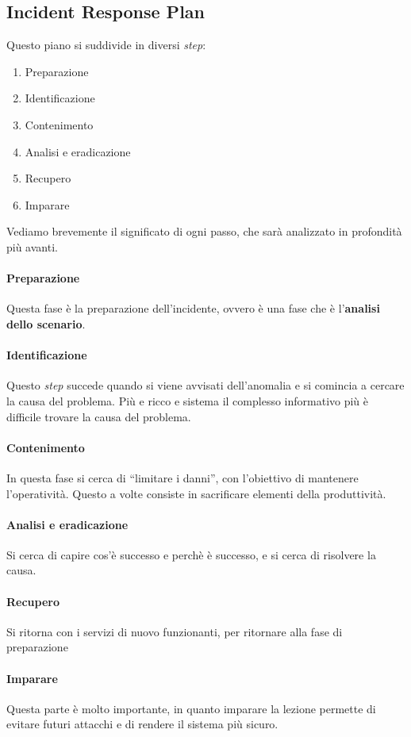 \subsection{Incident Response Plan}

Questo piano si suddivide in diversi \textit{step}:
\begin{enumerate}
\item Preparazione
\item Identificazione
\item Contenimento
\item Analisi e eradicazione
\item Recupero
\item Imparare
\end{enumerate} 

Vediamo brevemente il significato di ogni passo, che sarà analizzato in 
profondità più avanti.

\paragraph*{Preparazione} Questa fase è la preparazione dell'incidente, ovvero è 
una fase che è l'\textbf{analisi dello scenario}.

\paragraph*{Identificazione} Questo \textit{step} succede quando si viene 
avvisati dell'anomalia e si comincia a cercare la causa del problema. Più e 
ricco e sistema il complesso informativo più è difficile trovare la causa del 
problema.

\paragraph*{Contenimento} In questa fase si cerca di ``limitare i danni'', con 
l'obiettivo di mantenere l'operatività. Questo a volte consiste in sacrificare 
elementi della produttività.

\paragraph*{Analisi e eradicazione} Si cerca di capire cos'è successo e perchè è 
successo, e si cerca di risolvere la causa.

\paragraph*{Recupero} Si ritorna con i servizi di nuovo funzionanti, per 
ritornare alla fase di preparazione

\paragraph*{Imparare} Questa parte è molto importante, in quanto imparare la 
lezione permette di evitare futuri attacchi e di rendere il sistema più sicuro.
